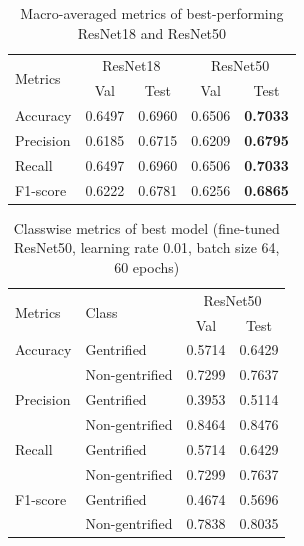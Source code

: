 \begin{table}[h]
    \begin{tabular}{lcc|cc}
\multirow{2}{*}{Metrics} & \multicolumn{2}{c|}{ResNet18} & \multicolumn{2}{c}{ResNet50} \\ \cline{2-5} 
                         & Val           & Test          & Val           & Test         \\ \hline
Accuracy                 & 0.6497        & 0.6960        & 0.6506        & \textbf{0.7033}       \\
Precision                & 0.6185        & 0.6715        & 0.6209        & \textbf{0.6795}       \\
Recall                   & 0.6497        & 0.6960        & 0.6506        & \textbf{0.7033}       \\
F1-score                 & 0.6222        & 0.6781        & 0.6256        & \textbf{0.6865}      
    \end{tabular}
    \caption{Macro-averaged metrics of best-performing ResNet18 and ResNet50}
    \label{fig:resnet_compare}
\end{table}


\begin{table}[h]
\begin{tabular}{llcc}
\multirow{2}{*}{Metrics}   & \multirow{2}{*}{Class} & \multicolumn{2}{c}{ResNet50} \\ \cline{3-4} 
                           &                        & Val           & Test         \\ \hline
Accuracy                   & Gentrified             & 0.5714        & 0.6429       \\
                           & Non-gentrified         & 0.7299        & 0.7637       \\
Precision                  & Gentrified             & 0.3953        & 0.5114       \\
                           & Non-gentrified         & 0.8464        & 0.8476       \\
Recall                     & Gentrified             & 0.5714        & 0.6429       \\
                           & Non-gentrified         & 0.7299        & 0.7637       \\
F1-score                   & Gentrified             & 0.4674        & 0.5696       \\
                           & Non-gentrified         & 0.7838        & 0.8035      
\end{tabular}
\caption{Classwise metrics of best model (fine-tuned ResNet50, learning rate 0.01, batch size 64, 60 epochs)}
\label{fig:resnet50_cls}
\end{table}

